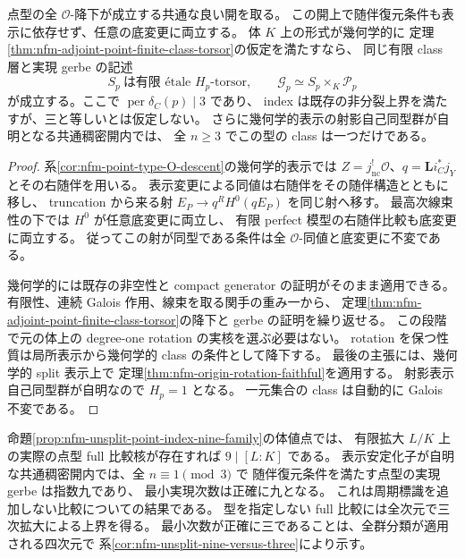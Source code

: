 \begin{lemma}[随伴復元点型の非分裂降下]
\label{lem:nfm-adjoint-point-unsplit-descent}
点型の全 $\mathcal O$-降下が成立する共通な良い開を取る。
この開上で随伴復元条件も表示に依存せず、任意の底変更に両立する。
体 $K$ 上の形式が幾何学的に
定理\ref{thm:nfm-adjoint-point-finite-class-torsor}の仮定を満たすなら、
同じ有限 class 層と実現 gerbe の記述
\[
 S_p\ \text{は有限 \'etale }H_p\text{-torsor},\qquad
 \mathscr G_p\simeq S_p\times_K\mathscr P_p
\]
が成立する。ここで $\operatorname{per}\delta_C(p)\mid3$ であり、
index は既存の非分裂上界を満たすが、三と等しいとは仮定しない。
さらに幾何学的表示の射影自己同型群が自明となる共通稠密開内では、
全 $n\ge3$ でこの型の class は一つだけである。
\end{lemma}

\begin{proof}
系\ref{cor:nfm-point-type-O-descent}の幾何学的表示では
$Z=j_{\mathrm{nc}}^!\mathcal O$、$q=\mathbf L i_C^*j_Y$ とその右随伴を用いる。
表示変更による同値は右随伴をその随伴構造とともに移し、
truncation から来る射 $E_P\to q^RH^0(qE_P)$ を同じ射へ移す。
最高次線束性の下では $H^0$ が任意底変更に両立し、
有限 perfect 模型の右随伴比較も底変更に両立する。
従ってこの射が同型である条件は全 $\mathcal O$-同値と底変更に不変である。

幾何学的には既存の非空性と compact generator の証明がそのまま適用できる。
有限性、連続 Galois 作用、線束を取る関手の重み一から、
定理\ref{thm:nfm-adjoint-point-finite-class-torsor}の降下と gerbe の証明を繰り返せる。
この段階で元の体上の degree-one rotation の実核を選ぶ必要はない。
rotation を保つ性質は局所表示から幾何学的 class の条件として降下する。
最後の主張には、幾何学的 split 表示上で
定理\ref{thm:nfm-origin-rotation-faithful}を適用する。
射影表示自己同型群が自明なので $H_p=1$ となる。
一元集合の class は自動的に Galois 不変である。
\end{proof}

\begin{corollary}[非分裂点型での九整除性と全該当次元での達成]
\label{cor:nfm-unsplit-point-minimum-nine}
命題\ref{prop:nfm-unsplit-point-index-nine-family}の体値点では、
有限拡大 $L/K$ 上の実際の点型 full 比較核が存在すれば
$9\mid[L:K]$ である。
表示安定化子が自明な共通稠密開内では、全 $n\equiv1\pmod3$ で
随伴復元条件を満たす点型の実現 gerbe は指数九であり、
最小実現次数は正確に九となる。
これは周期標識を追加しない比較についての結果である。
型を指定しない full 比較には全次元で三次拡大による上界を得る。
最小次数が正確に三であることは、全群分類が適用される四次元で
系\ref{cor:nfm-unsplit-nine-versus-three}により示す。
\end{corollary}

